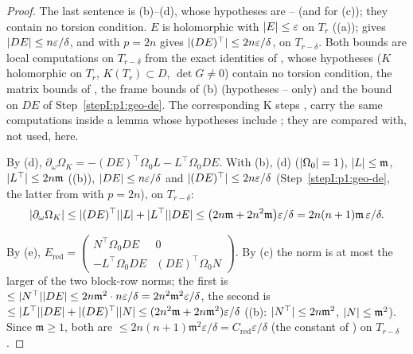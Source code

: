 \begin{proof}
\sloppy The last sentence is (b)--(d), whose hypotheses are -- (and  for (c)); they contain no torsion condition.
\label{stepI:p1:geo-de}\sloppy
$E$ is holomorphic with $\lvert E\rvert\le\varepsilon$ on $T_r$ ((a));  gives $\lvert DE\rvert\le n\varepsilon/\delta$, and  with $p=2n$ gives $\lvert (DE)^\top\rvert\le2n\varepsilon/\delta$, on $T_{r-\delta}$.
\label{stepI:p1:geo-red}
Both bounds are local computations on $T_{r-\delta}$ from the exact identities of , whose hypotheses ($K$ holomorphic on $T_r$, $K(T_r)\subset D$, $\det G\ne0$) contain no torsion condition, the matrix bounds of , the frame bounds of (b) (hypotheses -- only) and the bound on $DE$ of Step~\ref{stepI:p1:geo-de}. The corresponding K steps ,  carry the same computations inside a lemma whose hypotheses include ; they are compared with, not used, here.

\label{stepI:p1:geo-red-domega}
By (d), $\partial_\omega\Omega_K=-(DE)^\top\Omega_0L-L^\top\Omega_0DE$. With (b), (d) ($\lvert \Omega_0\rvert=1$), $\lvert L\rvert\le\mathfrak m$, $\lvert L^\top\rvert\le2n\mathfrak m$ ((b)), $\lvert DE\rvert\le n\varepsilon/\delta$ and $\lvert (DE)^\top\rvert\le2n\varepsilon/\delta$ (Step~\ref{stepI:p1:geo-de}, the latter from  with $p=2n$), on $T_{r-\delta}$:
\[
\lvert \partial_\omega\Omega_K\rvert\le\lvert (DE)^\top\rvert\lvert L\rvert+\lvert L^\top\rvert\lvert DE\rvert\le\bigl(2n\mathfrak m+2n^2\mathfrak m\bigr)\varepsilon/\delta=2n(n+1)\mathfrak m\,\varepsilon/\delta.
\]

\label{stepI:p1:geo-red-ered}
By (e), $E_{\mathrm{red}}=\begin{pmatrix}N^\top\Omega_0DE&0\\-L^\top\Omega_0DE&(DE)^\top\Omega_0N\end{pmatrix}$. By (c) the norm is at most the larger of the two block-row norms; the first is $\le\lvert N^\top\rvert\lvert DE\rvert\le2n\mathfrak m^2\cdot n\varepsilon/\delta=2n^2\mathfrak m^2\varepsilon/\delta$, the second is $\le\lvert L^\top\rvert\lvert DE\rvert+\lvert (DE)^\top\rvert\lvert N\rvert\le(2n^2\mathfrak m+2n\mathfrak m^2)\varepsilon/\delta$ ((b): $\lvert N^\top\rvert\le2n\mathfrak m^2$, $\lvert N\rvert\le\mathfrak m^2$). Since $\mathfrak m\ge1$, both are $\le2n(n+1)\mathfrak m^2\varepsilon/\delta=C_{\mathrm{red}}\varepsilon/\delta$ (the constant of ) on $T_{r-\delta}$.


\end{proof}
